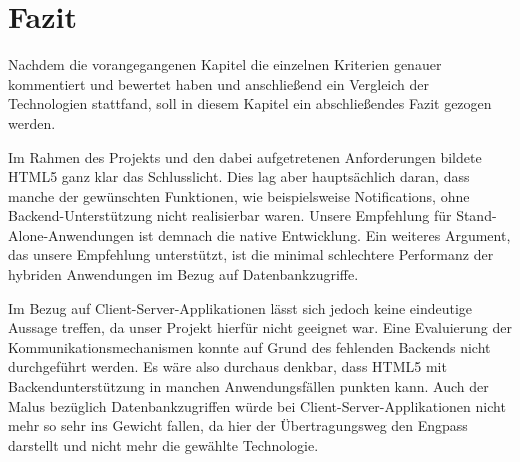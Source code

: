 \section{Fazit}
Nachdem die vorangegangenen Kapitel die einzelnen Kriterien genauer kommentiert und bewertet haben und anschließend ein Vergleich der Technologien stattfand, soll in diesem Kapitel ein abschließendes Fazit gezogen werden.

Im Rahmen des Projekts und den dabei aufgetretenen Anforderungen bildete HTML5 ganz klar das Schlusslicht. Dies lag aber hauptsächlich daran, dass manche der gewünschten Funktionen, wie beispielsweise Notifications, ohne Backend-Unterstützung nicht realisierbar waren. Unsere Empfehlung für Stand-Alone-Anwendungen ist demnach die native Entwicklung. Ein weiteres Argument, das unsere Empfehlung unterstützt, ist die minimal schlechtere Performanz der hybriden Anwendungen im Bezug auf Datenbankzugriffe. 

Im Bezug auf Client-Server-Applikationen lässt sich jedoch keine eindeutige Aussage treffen, da unser Projekt hierfür nicht geeignet war. Eine Evaluierung der Kommunikationsmechanismen konnte auf Grund des fehlenden Backends nicht durchgeführt werden. Es wäre also durchaus denkbar, dass HTML5 mit Backendunterstützung in manchen Anwendungsfällen punkten kann. Auch der Malus bezüglich Datenbankzugriffen würde bei Client-Server-Applikationen nicht mehr so sehr ins Gewicht fallen, da hier der Übertragungsweg den Engpass darstellt und nicht mehr die gewählte Technologie.
